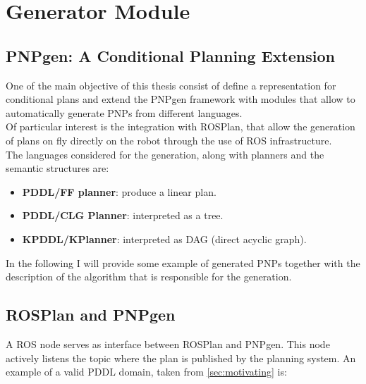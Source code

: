 \documentclass[pdftex,12pt,a4paper]{report}
\begin{document}
\section{Generator Module}
\subsection{PNPgen: A Conditional Planning Extension}
One of the main objective of this thesis consist of define a representation for conditional plans and extend the PNPgen framework with modules that allow to automatically generate PNPs from different languages.\\
Of particular interest is the integration with ROSPlan, that allow the generation of plans on fly directly on the robot through the use of ROS infrastructure.\\ 
The languages considered for the generation, along with planners and the semantic structures are:
\begin{itemize}
\item \textbf{PDDL/FF planner}: produce a linear plan.
\item \textbf{PDDL/CLG Planner}: interpreted as a tree. 
\item \textbf{KPDDL/KPlanner}: interpreted as DAG (direct acyclic graph).
\end{itemize}

\noindent In the following I will provide some example of generated PNPs together with the description of the algorithm that is responsible for the generation.

\subsection{ROSPlan and PNPgen}
A ROS node serves as interface between ROSPlan and PNPgen. This node actively listens the topic where the plan is published by the planning system.  An example of a valid PDDL domain, taken from \ref{sec:motivating} is:
\end{document}
